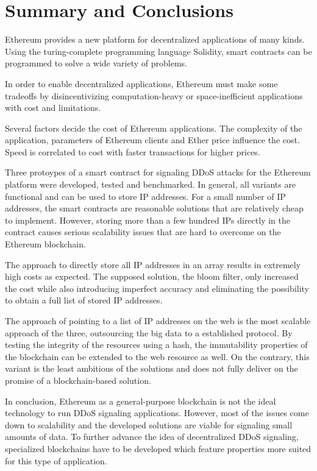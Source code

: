 \chapter{Summary and Conclusions}

Ethereum provides a new platform for decentralized applications of many kinds. Using the turing-complete programming language Solidity, smart contracts can be programmed to solve a wide variety of problems.

In order to enable decentralized applications, Ethereum must make some tradeoffs by disincentivizing computation-heavy or space-inefficient applications with cost and limitations.

Several factors decide the cost of Ethereum applications. The complexity of the application, parameters of Ethereum clients and Ether price influence the cost. Speed is correlated to cost with faster transactions for higher prices.

Three protoypes of a smart contract for signaling DDoS attacks for the Ethereum platform were developed, tested and benchmarked. In general, all variants are functional and can be used to store IP addresses. For a small number of IP addresses, the smart contracts are reasonable solutions that are relatively cheap to implement. However, storing more than a few hundred IPs directly in the contract causes serious scalability issues that are hard to overcome on the Ethereum blockchain.

The approach to directly store all IP addresses in an array results in extremely high costs as expected. The supposed solution, the bloom filter, only increased the cost while also introducing imperfect accuracy and eliminating the possibility to obtain a full list of stored IP addresses.

The approach of pointing to a list of IP addresses on the web is the most scalable approach of the three, outsourcing the big data to a established protocol. By testing the integrity of the resources using a hash, the immutability properties of the blockchain can be extended to the web resource as well. On the contrary, this variant is the least ambitious of the solutions and does not fully deliver on the promise of a blockchain-based solution.

In conclusion, Ethereum as a general-purpose blockchain is not the ideal technology to run DDoS signaling applications. However, most of the issues come down to scalability and the developed solutions are viable for signaling small amounts of data. To further advance the idea of decentralized DDoS signaling, specialized blockchains have to be developed which feature properties more suited for this type of application.

